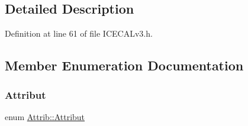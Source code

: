 \subsection{Detailed Description}


Definition at line 61 of file I\+C\+E\+C\+A\+Lv3.\+h.



\subsection{Member Enumeration Documentation}
\mbox{\label{classAttrib_a69e171d7cc6417835a5a306d3c764235}} 
\subsubsection{\texorpdfstring{Attribut}{Attribut}}
{\footnotesize\ttfamily enum \hyperlink{classAttrib_a69e171d7cc6417835a5a306d3c764235}{Attrib\+::\+Attribut}\hspace{0.3cm}{\ttfamily [inherited]}}


